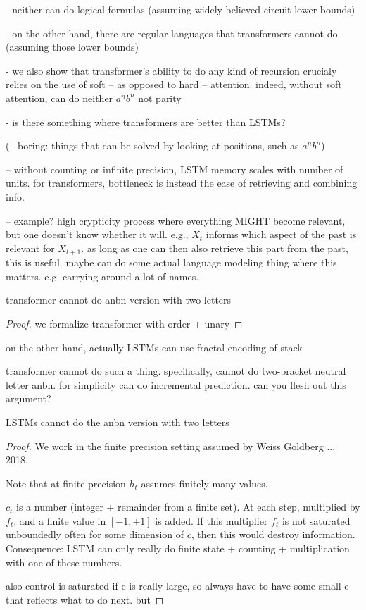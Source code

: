 \documentclass[11pt,a4paper]{article}
\begin{document}
- neither can do logical formulas (assuming widely believed circuit lower bounds)

- on the other hand, there are regular languages that transformers cannot do (assuming those lower bounds)

- we also show that transformer's ability to do any kind of recursion crucialy relies on the use of soft -- as opposed to hard -- attention.
indeed, without soft attention, can do neither $a^nb^n$ not parity

- is there something where transformers are better than LSTMs?

(-- boring: things that can be solved by looking at positions, such as $a^nb^n$)

-- without counting or infinite precision, LSTM memory scales with number of units. for transformers, bottleneck is instead the ease of retrieving and combining info.

-- example? high crypticity process where everything MIGHT become relevant, but one doesn't know whether it will. e.g., $X_t$ informs which aspect of the past is relevant for $X_{t+1}$. as long as one can then also retrieve this part from the past, this is useful. maybe can do some actual language modeling thing where this matters. e.g. carrying around a lot of names.



transformer cannot do anbn version with two letters
\begin{proof}
we formalize transformer with order + unary
\end{proof}


on the other hand, actually LSTMs can use fractal encoding of stack

transformer cannot do such a thing. specifically, cannot do two-bracket neutral letter anbn. for simplicity can do incremental prediction. can you flesh out this argument?



LSTMs cannot do the anbn version with two letters
\begin{proof}
We work in the finite precision setting assumed by Weiss Goldberg ... 2018.

Note that at finite precision $h_t$ assumes finitely many values.

$c_t$ is a number (integer + remainder from a finite set). At each step, multiplied by $f_t$, and a finite value in $[-1,+1]$ is added.
If this multiplier $f_t$ is not saturated unboundedly often for some dimension of $c$, then this would destroy information.
Consequence: LSTM can only really do finite state + counting + multiplication with one of these numbers.

also control is saturated if c is really large, so always have to have some small c that reflects what to do next. but 
\end{proof}
\end{document}
